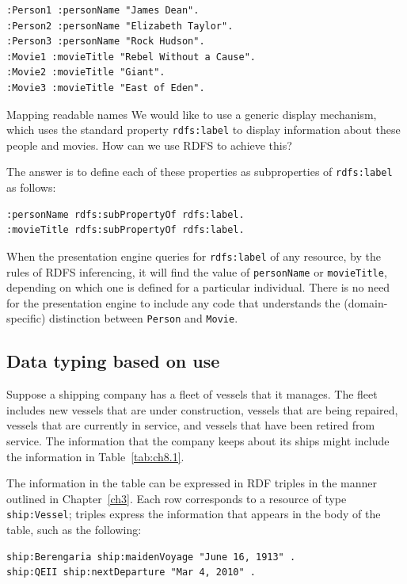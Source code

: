 \begin{lstlisting}
:Person1 :personName "James Dean".
:Person2 :personName "Elizabeth Taylor".
:Person3 :personName "Rock Hudson".
:Movie1 :movieTitle "Rebel Without a Cause".
:Movie2 :movieTitle "Giant".
:Movie3 :movieTitle "East of Eden".
\end{lstlisting}

\begin{challenge}{Mapping readable names}
\label{chal:9}
We would like to use a generic display mechanism, which uses the
standard property \texttt{rdfs:label} to display information about these people
and movies. How can we use RDFS to achieve this?

\solution

The answer is to define each of these properties as subproperties of
\texttt{rdfs:label} as follows:

\begin{lstlisting}
:personName rdfs:subPropertyOf rdfs:label.
:movieTitle rdfs:subPropertyOf rdfs:label.
\end{lstlisting}

When the presentation engine queries for \texttt{rdfs:label} of any resource, by
the rules of RDFS inferencing, it will find the value of \texttt{personName} or
\texttt{movieTitle}, depending on which one is defined for a particular
individual. There is no need for the presentation engine to include any
code that understands the (domain-specific) distinction between \texttt{Person}
and \texttt{Movie}.
\end{challenge}

\subsection{Data typing based on use}

Suppose a shipping company has a fleet of vessels that it manages. The
fleet includes new vessels that are under construction, vessels that are
being repaired, vessels that are currently in service, and vessels that
have been retired from service. The information that the company keeps
about its ships might include the information in Table~\ref{tab:ch8.1}.

The information in the table can be expressed in RDF triples in the
manner outlined in Chapter~\ref{ch3}. Each row corresponds to a resource of type
\texttt{ship:Vessel}; triples express the information that appears in the body of
the table, such as the following:

\begin{lstlisting}
ship:Berengaria ship:maidenVoyage "June 16, 1913" .
ship:QEII ship:nextDeparture "Mar 4, 2010" .
\end{lstlisting}

